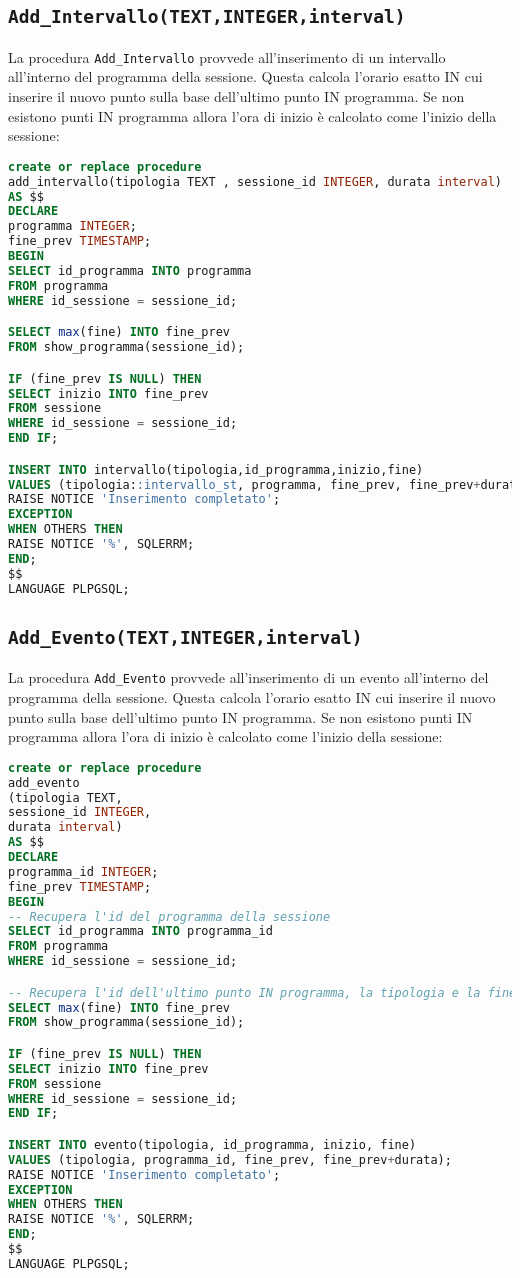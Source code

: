 \subsection{\texttt{Add\_Intervallo(TEXT,INTEGER,interval)}}
La procedura \texttt{Add\_Intervallo} provvede all'inserimento di un intervallo all'interno del programma della sessione. Questa calcola l'orario esatto IN cui inserire il nuovo punto sulla base dell'ultimo punto IN programma. Se non esistono punti IN programma allora l'ora di inizio è calcolato come l'inizio della sessione:
\begin{lstlisting}[language=SQL,style=mystyle]
create or replace procedure 
add_intervallo(tipologia TEXT , sessione_id INTEGER, durata interval)
AS $$
DECLARE
programma INTEGER;
fine_prev TIMESTAMP;
BEGIN
SELECT id_programma INTO programma
FROM programma
WHERE id_sessione = sessione_id;

SELECT max(fine) INTO fine_prev
FROM show_programma(sessione_id);

IF (fine_prev IS NULL) THEN
SELECT inizio INTO fine_prev
FROM sessione
WHERE id_sessione = sessione_id;
END IF;

INSERT INTO intervallo(tipologia,id_programma,inizio,fine)
VALUES (tipologia::intervallo_st, programma, fine_prev, fine_prev+durata);
RAISE NOTICE 'Inserimento completato';
EXCEPTION
WHEN OTHERS THEN
RAISE NOTICE '%', SQLERRM;
END;
$$ 
LANGUAGE PLPGSQL;
\end{lstlisting}
\subsection{\texttt{Add\_Evento(TEXT,INTEGER,interval)}}
La procedura \texttt{Add\_Evento} provvede all'inserimento di un evento all'interno del programma della sessione. Questa calcola l'orario esatto IN cui inserire il nuovo punto sulla base dell'ultimo punto IN programma. Se non esistono punti IN programma allora l'ora di inizio è calcolato come l'inizio della sessione:
\begin{lstlisting}[language=SQL,style=mystyle]
create or replace procedure 
add_evento
(tipologia TEXT, 
sessione_id INTEGER, 
durata interval)
AS $$
DECLARE
programma_id INTEGER;
fine_prev TIMESTAMP;
BEGIN
-- Recupera l'id del programma della sessione
SELECT id_programma INTO programma_id
FROM programma
WHERE id_sessione = sessione_id;

-- Recupera l'id dell'ultimo punto IN programma, la tipologia e la fine
SELECT max(fine) INTO fine_prev
FROM show_programma(sessione_id);

IF (fine_prev IS NULL) THEN
SELECT inizio INTO fine_prev
FROM sessione
WHERE id_sessione = sessione_id;
END IF;

INSERT INTO evento(tipologia, id_programma, inizio, fine)
VALUES (tipologia, programma_id, fine_prev, fine_prev+durata);
RAISE NOTICE 'Inserimento completato';
EXCEPTION
WHEN OTHERS THEN
RAISE NOTICE '%', SQLERRM;
END;
$$
LANGUAGE PLPGSQL;
\end{lstlisting}
